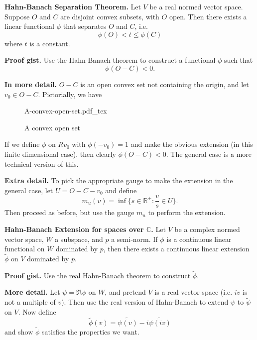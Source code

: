 \documentclass[12pt, letterpaper]{article}
\newcommand{\incfig}[2][1]{%
    \def\svgwidth{#1\columnwidth}
    {#2.pdf_tex}
}
\newcommand{\bR}{{\mathbb R}}
\newcommand{\bC}{{\mathbb C}}
\begin{document}
\textbf{Hahn-Banach Separation Theorem.} Let $V$ be a real normed vector space. Suppose $O$ and $C$ are disjoint convex subsets, with $O$ open. Then there exists a linear functional $\phi$ that separates $O$ and $C$, i.e.
\[
    \phi(O) < t \leq \phi(C)
\]
where $t$ is a constant.

\textbf{Proof gist.} Use the Hahn-Banach theorem to construct a functional $\phi$ such that
\[
    \phi(O-C) < 0.
\]

\textbf{In more detail.} $O-C$ is an open convex set not containing the origin, and let $v_0 \in O-C$. Pictorially, we have
\begin{figure}[ht]
    \centering
    \incfig[0.5]{A-convex-open-set}
    \caption{A convex open set}
    \label{fig:A-convex-open-set}
\end{figure}

If we define $\phi$ on $Rv_0$ with $\phi(-v_0) = 1$ and make the obvious extension (in this finite dimensional case), then clearly $\phi(O-C) < 0$. The general case is a more technical version of this.

\textbf{Extra detail.} To pick the appropriate gauge to make the extension in the general case, let $U = O - C - v_0$ and define
\[
    m_u(v) = \inf{\{s \in \bR^+: \frac{v}{s} \in U\}}.
\]
Then proceed as before, but use the gauge $m_u$ to perform the extension.

\newpage

\textbf{Hahn-Banach Extension for spaces over $\bC$.} Let $V$ be a complex normed vector space, $W$ a subspace, and $p$ a semi-norm. If $\phi$ is a continuous linear functional on $W$ dominated by $p$, then there exists a continuous linear extension $\tilde{\phi}$ on $V$ dominated by $p$.

\textbf{Proof gist.} Use the real Hahn-Banach theorem to construct $\tilde{\phi}$.

\textbf{More detail.} Let $\psi = \Re{\phi}$ on $W$, and pretend $V$ is a real vector space (i.e. $iv$ is not a multiple of $v$). Then use the real version of Hahn-Banach to extend $\psi$ to $\tilde{\psi}$ on $V$. Now define
\[
    \tilde{\phi}(v) = \tilde{\psi(v)} - i\tilde{\psi(iv)}
\]
and show $\tilde{\phi}$ satisfies the properties we want.
\end{document}
